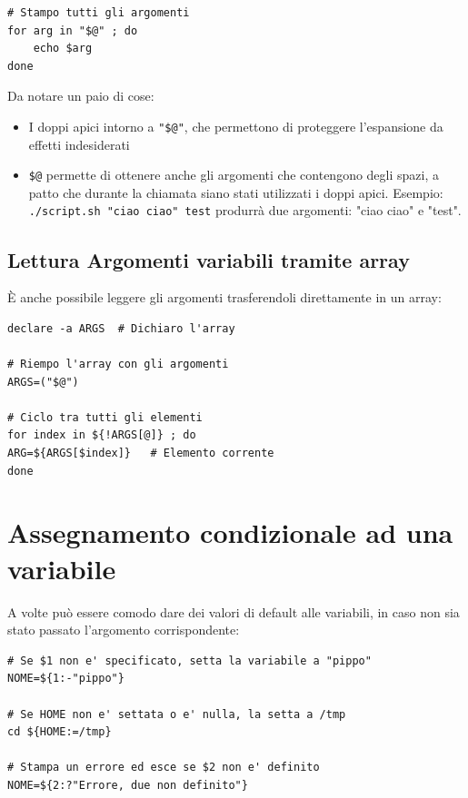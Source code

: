\documentclass[a4paper]{report}
\newenvironment{info}{\begin{tcolorbox}[fonttitle=\sffamily\bfseries\large,title=Info,colframe=blue!75!white]}{\end{tcolorbox}}
\newenvironment{code}{\begin{tcolorbox}[size=small]}{\end{tcolorbox}}
\begin{document}
\begin{code}
\begin{lstlisting}
# Stampo tutti gli argomenti
for arg in "$@" ; do
	echo $arg
done
\end{lstlisting}
\end{code}

\begin{info}
Da notare un paio di cose:
\begin{itemize}
	\item I doppi apici intorno a \texttt{"\$@"}, che permettono di proteggere l'espansione da effetti indesiderati
	\item \texttt{\$@} permette di ottenere anche gli argomenti che contengono degli spazi, a patto che durante la chiamata siano stati utilizzati i doppi apici. Esempio: \texttt{./script.sh "ciao ciao" test} produrrà due argomenti: "ciao ciao" e "test".
\end{itemize}
\end{info}

\subsection{Lettura Argomenti variabili tramite array}

È anche possibile leggere gli argomenti trasferendoli direttamente in un array:

\begin{code}
\begin{lstlisting}
declare -a ARGS  # Dichiaro l'array

# Riempo l'array con gli argomenti
ARGS=("$@")

# Ciclo tra tutti gli elementi
for index in ${!ARGS[@]} ; do
ARG=${ARGS[$index]}   # Elemento corrente
done
\end{lstlisting}
\end{code}

\section{Assegnamento condizionale ad una variabile}
A volte può essere comodo dare dei valori di default alle variabili, in caso non sia stato passato l'argomento corrispondente:
\begin{code}
\begin{lstlisting}
# Se $1 non e' specificato, setta la variabile a "pippo"
NOME=${1:-"pippo"}

# Se HOME non e' settata o e' nulla, la setta a /tmp
cd ${HOME:=/tmp}

# Stampa un errore ed esce se $2 non e' definito
NOME=${2:?"Errore, due non definito"}
\end{lstlisting}
\end{code}
\end{document}
